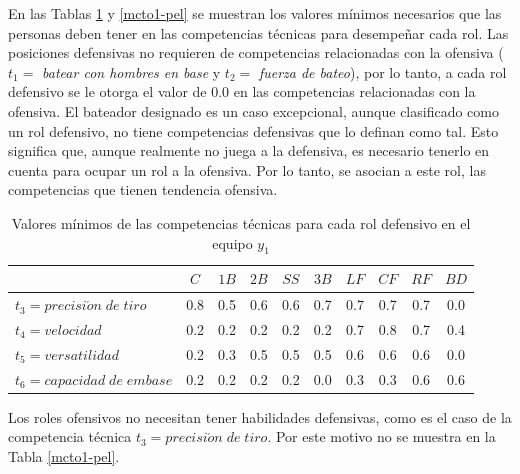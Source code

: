 En las Tablas \ref{mctd1-pel} y \ref{mcto1-pel} se muestran los valores mínimos necesarios que las personas deben tener en las competencias técnicas para desempeñar cada rol. Las posiciones defensivas no requieren de competencias relacionadas con la ofensiva ($t_1=$ \textit{batear con hombres en base} y $t_2=$ \textit{fuerza de bateo}), por lo tanto, a cada rol defensivo se le otorga el valor de 0.0 en las competencias relacionadas con la ofensiva. El bateador designado es un caso excepcional, aunque clasificado como un rol defensivo, no tiene competencias defensivas que lo definan como tal. Esto significa que, aunque realmente no juega a la defensiva, es necesario tenerlo en cuenta para ocupar un rol a la ofensiva. Por lo tanto, se asocian a este rol, las competencias que tienen tendencia ofensiva.
\begin{table}[H]
	\caption{Valores mínimos de las competencias técnicas para cada rol defensivo en el equipo $y_1$}\label{mctd1-pel}
	\begin{tabular}{|l|c|c|c|c|c|c|c|c|c|}
		\hline
		\thead{$Q(t,r,y)$} & $C$ & $1B$  & $2B$ & $SS$ & $3B$ & $LF$ & $CF$ & $RF$ & $BD$  \\ \hline
		$t_3=precisi\acute{o}n\;de\;tiro$ 		 & 0.8 &  0.5  &  0.6 & 0.6  & 0.7  & 0.7  & 0.7  &  0.7 & 0.0 \\ \hline
		$t_4=velocidad$ 		 & 0.2 &  0.2  &  0.2 & 0.2  & 0.2  & 0.7  & 0.8  &  0.7 &  0.4 \\ \hline
		$t_5=versatilidad$   	 & 0.2 &  0.3  &  0.5 & 0.5  & 0.5  & 0.6  & 0.6  &  0.6 & 0.0 \\ \hline
		$t_6=capacidad\;de\;embase$ & 0.2 &  0.2  &  0.2 & 0.2  & 0.0  & 0.3  & 0.3  &  0.6 & 0.6 \\ \hline
	\end{tabular}
\end{table}

Los roles ofensivos no necesitan tener habilidades defensivas, como es el caso de la competencia técnica $t_3=precisi\acute{o}n\;de\;tiro$. Por este motivo no se muestra en la Tabla \ref{mcto1-pel}.

